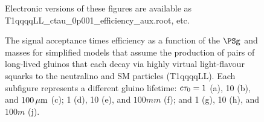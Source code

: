 \begin{figure}
\begin{center}
  \caption{ The signal acceptance times efficiency as a function of 
	    the $\PSg$ and \PSGczDo
    masses for simplified models that assume the production of pairs
    of long-lived gluinos that each decay via highly virtual
    light-flavour squarks to the neutralino and SM particles
    (T1qqqqLL). 
	    Each subfigure represents a different gluino lifetime:
    $c\tau_{0} = 1$ (a), 10 (b), and $100\,{\mu}\text{m}$ (c);
	     1 (d), 10 (e), and $100\unit{mm}$ (f);
	     and 1 (g), 10 (h), and $100\unit{m}$ (j).}
    Electronic versions of these figures are available as T1qqqqLL\_ctau\_0p001\_efficiency\_aux.root, etc.
        \label{fig:T1qqqqLL_eff}
    \end{center}
\end{figure}


